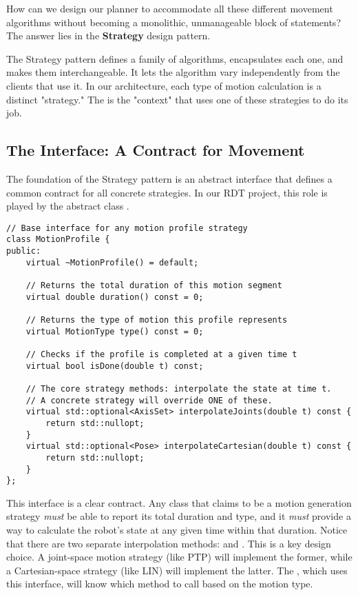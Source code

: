 How can we design our planner to accommodate all these different movement algorithms without becoming a monolithic, unmanageable block of  statements? The answer lies in the \textbf{Strategy} design pattern.

The Strategy pattern defines a family of algorithms, encapsulates each one, and makes them interchangeable. It lets the algorithm vary independently from the clients that use it. In our architecture, each type of motion calculation is a distinct "strategy." The  is the "context" that uses one of these strategies to do its job.

\subsection{The  Interface: A Contract for Movement}
\label{subsec:motionprofile_interface}

The foundation of the Strategy pattern is an abstract interface that defines a common contract for all concrete strategies. In our RDT project, this role is played by the abstract class \textbf{}.

\begin{verbatim}
// Base interface for any motion profile strategy
class MotionProfile {
public:
    virtual ~MotionProfile() = default;

    // Returns the total duration of this motion segment
    virtual double duration() const = 0;

    // Returns the type of motion this profile represents
    virtual MotionType type() const = 0;

    // Checks if the profile is completed at a given time t
    virtual bool isDone(double t) const;

    // The core strategy methods: interpolate the state at time t.
    // A concrete strategy will override ONE of these.
    virtual std::optional<AxisSet> interpolateJoints(double t) const {
        return std::nullopt;
    }
    virtual std::optional<Pose> interpolateCartesian(double t) const {
        return std::nullopt;
    }
};
\end{verbatim}
\label{lst:motionprofile-interface}

This interface is a clear contract. Any class that claims to be a motion generation strategy \textit{must} be able to report its total duration and type, and it \textit{must} provide a way to calculate the robot's state at any given time  within that duration. Notice that there are two separate interpolation methods:  and . This is a key design choice. A joint-space motion strategy (like PTP) will implement the former, while a Cartesian-space strategy (like LIN) will implement the latter. The , which uses this interface, will know which method to call based on the motion type.

